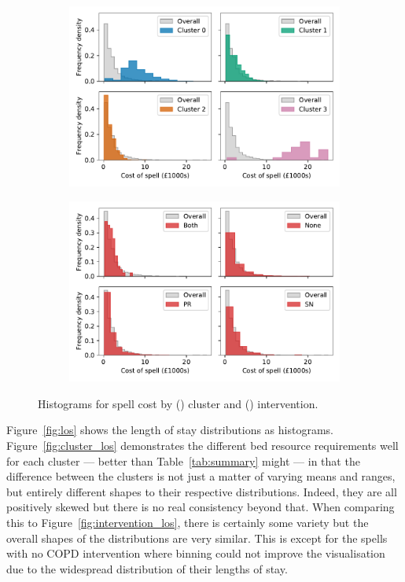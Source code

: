 \documentclass[11pt]{article}
\newlength{\imgwidth}
\begin{document}
\begin{figure}
    \centering
    \begin{subfigure}{.5\imgwidth}
        \includegraphics[width=\linewidth]{img_cluster_spell_cost}
        \caption{}\label{fig:cluster_cost}
    \end{subfigure}\hfill%
    \begin{subfigure}{.5\imgwidth}
        \includegraphics[width=\linewidth]{img_intervention_spell_cost}
        \caption{}\label{fig:intervention_cost}
    \end{subfigure}
    \caption{%
        Histograms for spell cost by () cluster and
        () intervention.
    }\label{fig:cost}
\end{figure}

Figure~\ref{fig:los} shows the length of stay distributions as histograms.
Figure~\ref{fig:cluster_los} demonstrates the different bed resource
requirements well for each cluster --- better than Table~\ref{tab:summary}
might --- in that the difference between the clusters is not just a matter of
varying means and ranges, but entirely different shapes to their respective
distributions. Indeed, they are all positively skewed but there is no real
consistency beyond that. When comparing this to
Figure~\ref{fig:intervention_los}, there is certainly some variety but the
overall shapes of the distributions are very similar. This is except for the
spells with no COPD intervention where binning could not improve the
visualisation due to the widespread distribution of their lengths of stay.
\end{document}
